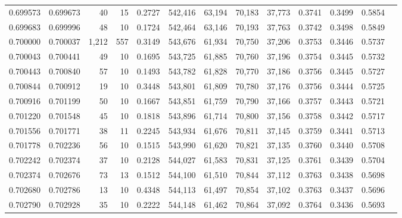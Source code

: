 \begin{tabular}{rrrrrrrrrrrrr}
0.699573 & 0.699673 &    40 &  15 &                                     0.2727 & 542,416 &  63,194 &  70,183 &  37,773 & 0.3741 & 0.3499 & 0.5854 \\
0.699683 & 0.699996 &    48 &  10 &                                     0.1724 & 542,464 &  63,146 &  70,193 &  37,763 & 0.3742 & 0.3498 & 0.5849 \\
0.700000 & 0.700037 & 1,212 & 557 &                                     0.3149 & 543,676 &  61,934 &  70,750 &  37,206 & 0.3753 & 0.3446 & 0.5737 \\
0.700043 & 0.700441 &    49 &  10 &                                     0.1695 & 543,725 &  61,885 &  70,760 &  37,196 & 0.3754 & 0.3445 & 0.5732 \\
0.700443 & 0.700840 &    57 &  10 &                                     0.1493 & 543,782 &  61,828 &  70,770 &  37,186 & 0.3756 & 0.3445 & 0.5727 \\
0.700844 & 0.700912 &    19 &  10 &                                     0.3448 & 543,801 &  61,809 &  70,780 &  37,176 & 0.3756 & 0.3444 & 0.5725 \\
0.700916 & 0.701199 &    50 &  10 &                                     0.1667 & 543,851 &  61,759 &  70,790 &  37,166 & 0.3757 & 0.3443 & 0.5721 \\
0.701220 & 0.701548 &    45 &  10 &                                     0.1818 & 543,896 &  61,714 &  70,800 &  37,156 & 0.3758 & 0.3442 & 0.5717 \\
0.701556 & 0.701771 &    38 &  11 &                                     0.2245 & 543,934 &  61,676 &  70,811 &  37,145 & 0.3759 & 0.3441 & 0.5713 \\
0.701778 & 0.702236 &    56 &  10 &                                     0.1515 & 543,990 &  61,620 &  70,821 &  37,135 & 0.3760 & 0.3440 & 0.5708 \\
0.702242 & 0.702374 &    37 &  10 &                                     0.2128 & 544,027 &  61,583 &  70,831 &  37,125 & 0.3761 & 0.3439 & 0.5704 \\
0.702374 & 0.702676 &    73 &  13 &                                     0.1512 & 544,100 &  61,510 &  70,844 &  37,112 & 0.3763 & 0.3438 & 0.5698 \\
0.702680 & 0.702786 &    13 &  10 &                                     0.4348 & 544,113 &  61,497 &  70,854 &  37,102 & 0.3763 & 0.3437 & 0.5696 \\
0.702790 & 0.702928 &    35 &  10 &                                     0.2222 & 544,148 &  61,462 &  70,864 &  37,092 & 0.3764 & 0.3436 & 0.5693 \\

\end{tabular}
